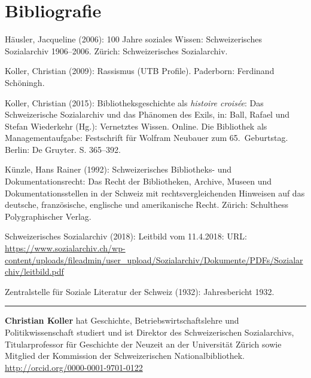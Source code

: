 \documentclass[a4paper,
fontsize=11pt,
oneside,
numbers=noperiodatend,
parskip=half-,
bibliography=totoc,
final
]{scrartcl}
\begin{document}
\hypertarget{bibliografie}{%
\section*{Bibliografie}\label{bibliografie}}

Häusler, Jacqueline (2006): 100 Jahre soziales Wissen: Schweizerisches
Sozialarchiv 1906--2006. Zürich: Schweizerisches Sozialarchiv.

Koller, Christian (2009): Rassismus (UTB Profile). Paderborn: Ferdinand
Schöningh.

Koller, Christian (2015): Bibliotheksgeschichte als \emph{histoire
croisée}: Das Schweizerische Sozialarchiv und das Phänomen des Exils,
in: Ball, Rafael und Stefan Wiederkehr (Hg.): Vernetztes Wissen. Online.
Die Bibliothek als Managementaufgabe: Festschrift für Wolfram Neubauer
zum 65.~Geburtstag. Berlin: De Gruyter. S. 365--392.

Künzle, Hans Rainer (1992): Schweizerisches Bibliotheks- und
Dokumentationsrecht: Das Recht der Bibliotheken, Archive, Museen und
Dokumentationsstellen in der Schweiz mit rechtsvergleichenden Hinweisen
auf das deutsche, französische, englische und amerikanische Recht.
Zürich: Schulthess Polygraphischer Verlag.

Schweizerisches Sozialarchiv (2018): Leitbild vom 11.4.2018: URL:
\url{https://www.sozialarchiv.ch/wp-content/uploads/fileadmin/user_upload/Sozialarchiv/Dokumente/PDFs/Sozialarchiv/leitbild.pdf}

Zentralstelle für Soziale Literatur der Schweiz (1932): Jahresbericht
1932.

\begin{center}\rule{0.5\linewidth}{\linethickness}\end{center}

\textbf{Christian Koller} hat Geschichte, Betriebswirtschaftslehre und
Politikwissenschaft studiert und ist Direktor des Schweizerischen
Sozialarchivs, Titularprofessor für Geschichte der Neuzeit an der
Universität Zürich sowie Mitglied der Kommission der Schweizerischen
Nationalbibliothek. \url{http://orcid.org/0000-0001-9701-0122}
\end{document}
